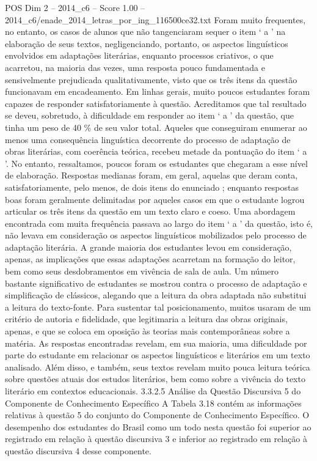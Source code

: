 \begin{textsample}{POS Dim 2 – 2014\_c6 – Score 1.00 – 2014\_c6/enade\_2014\_letras\_por\_ing\_116500ce32.txt}
Foram muito frequentes, no entanto, os casos de alunos que não tangenciaram sequer o item ‘ a ’ na elaboração de seus textos, negligenciando, portanto, os aspectos linguísticos envolvidos em adaptações literárias, enquanto processos criativos, o que acarretou, na maioria das vezes, uma resposta pouco fundamentada e sensivelmente prejudicada qualitativamente, visto que os três itens da questão funcionavam em encadeamento.
Em linhas gerais, muito poucos estudantes foram capazes de responder satisfatoriamente à questão.
Acreditamos que tal resultado se deveu, sobretudo, à dificuldade em responder ao item ‘ a ’ da questão, que tinha um peso de 40 \% de seu valor total.
Aqueles que conseguiram enumerar ao menos uma consequência linguística decorrente do processo de adaptação de obras literárias, com coerência teórica, recebeu metade da pontuação do item ‘ a ’.
No entanto, ressaltamos, poucos foram os estudantes que chegaram a esse nível de elaboração.
Respostas medianas foram, em geral, aquelas que deram conta, satisfatoriamente, pelo menos, de dois itens do enunciado ; enquanto respostas boas foram geralmente delimitadas por aqueles casos em que o estudante logrou articular os três itens da questão em um texto claro e coeso.
Uma abordagem encontrada com muita frequência passava ao largo do item ‘ a ’ da questão, isto é, não levava em consideração os aspectos linguísticos mobilizados pelo processo de adaptação literária.
A grande maioria dos estudantes levou em consideração, apenas, as implicações que essas adaptações acarretam na formação do leitor, bem como seus desdobramentos em vivência de sala de aula.
Um número bastante significativo de estudantes se mostrou contra o processo de adaptação e simplificação de clássicos, alegando que a leitura da obra adaptada não substitui a leitura do texto-fonte.
Para sustentar tal posicionamento, muitos usaram de um critério de autoria e fidelidade, que legitimaria a leitura das obras originais, apenas, e que se coloca em oposição às teorias mais contemporâneas sobre a matéria.
As respostas encontradas revelam, em sua maioria, uma dificuldade por parte do estudante em relacionar os aspectos linguísticos e literários em um texto analisado.
Além disso, e também, seus textos revelam muito pouca leitura teórica sobre questões atuais dos estudos literários, bem como sobre a vivência do texto literário em contextos educacionais. 3.3.2.5 Análise da Questão Discursiva 5 do Componente de Conhecimento Específico A Tabela 3.18 contém as informações relativas à questão 5 do conjunto do Componente de Conhecimento Específico.
O desempenho dos estudantes do Brasil como um todo nesta questão foi superior ao registrado em relação à questão discursiva 3 e inferior ao registrado em relação à questão discursiva 4 desse componente.

\end{textsample}
